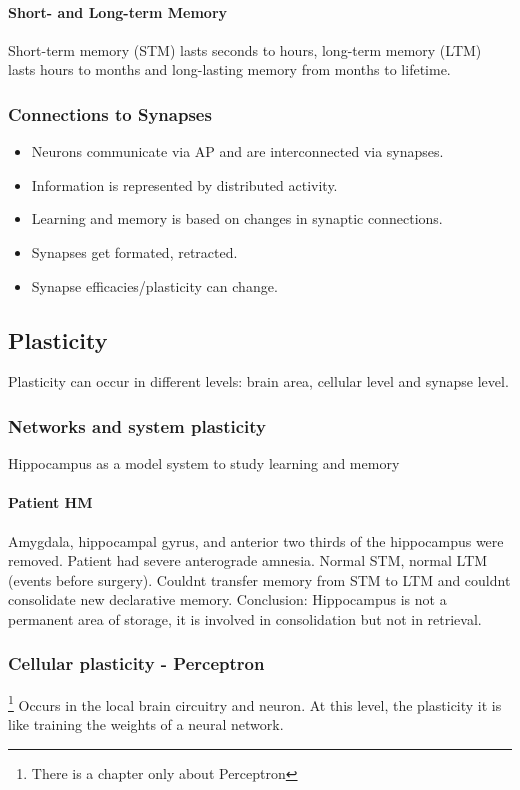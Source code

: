 \documentclass[main]{subfiles}
\begin{document}
\paragraph{Short- and Long-term Memory}
Short-term memory (STM) lasts seconds to hours, long-term memory (LTM) lasts hours to months and long-lasting memory from months to lifetime.

\subsubsection{Connections to Synapses}
\begin{itemize}[noitemsep,nolistsep]
	\item Neurons communicate via AP and are interconnected via synapses.
	\item Information is represented by distributed activity.
	\item Learning and memory is based on changes in synaptic connections.
	\item Synapses get formated, retracted.
	\item Synapse efficacies/plasticity can change.
\end{itemize}

\subsection{Plasticity}
Plasticity can occur in different levels: brain area, cellular level and synapse level.

\subsubsection{Networks and system plasticity}
Hippocampus as a model system to study learning and memory

\paragraph{Patient HM}
Amygdala, hippocampal gyrus, and anterior two thirds of the hippocampus	were	removed. Patient had severe anterograde amnesia. Normal STM, normal LTM (events before surgery). Couldnt transfer memory from STM to LTM and couldnt consolidate new declarative memory.
Conclusion: Hippocampus is not a permanent area of storage, it is involved in consolidation but not in retrieval.

\subsubsection{Cellular plasticity - Perceptron}\footnote{There is a chapter only about Perceptron}
Occurs in the local brain circuitry and neuron. At this level, the plasticity it is like training the weights of a neural network.
\end{document}
